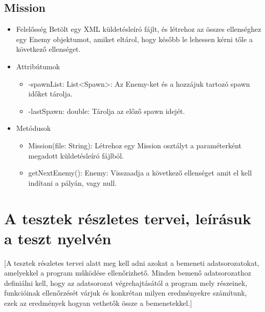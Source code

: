 \subsection{Mission}
\begin{itemize}
\item Felelősség\newline
Betölt egy XML küldetésleíró fájlt, és létrehoz az összes ellenséghez egy Enemy objektumot, amiket eltárol, hogy később le lehessen kérni tőle a következő ellenséget.
\item Attribútumok\newline
	\begin{itemize}
		\item -spawnList: List<Spawn>: Az Enemy-ket és a hozzájuk tartozó spawn időket tárolja.
		\item -lastSpawn: double: Tárolja az előző spawn idejét.
	\end{itemize}
\item Metódusok\newline
	\begin{itemize}
		\item Mission(file: String): Létrehoz egy Mission osztályt a paraméterként megadott küldetésleíró fájlból.
		\item getNextEnemy(): Enemy: Visszaadja a következő ellenséget amit el kell indítani a pályán, vagy null.
	\end{itemize}
\end{itemize}

\section{A tesztek részletes tervei, leírásuk a teszt nyelvén}
[A tesztek részletes tervei alatt meg kell adni azokat a bemeneti adatsorozatokat, amelyekkel a program működése ellenőrizhető. Minden bemenő adatsorozathoz definiálni kell, hogy az adatsorozat végrehajtásától a program mely részeinek, funkcióinak ellenőrzését várjuk és konkrétan milyen eredményekre számítunk, ezek az eredmények hogyan vethetők össze a bemenetekkel.]

